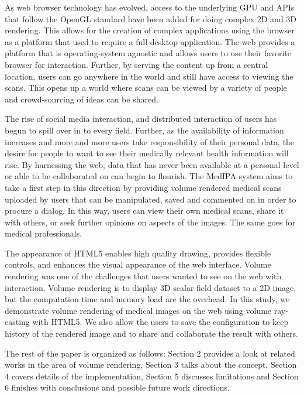\documentclass[annual]{acmsiggraph}
\begin{document}
As web browser technology has evolved, access to the underlying GPU and APIs that follow the OpenGL standard have been added for doing complex 2D and 3D rendering.  This allows for the creation of complex applications using the browser as a platform that used to require a full desktop application.  The web provides a platform that is operating-system agnostic and allows users to use their favorite browser for interaction.  Further, by serving the content up from a central location, users can go anywhere in the world and still have access to viewing the scans.  This opens up a world where scans can be viewed by a variety of people and crowd-sourcing of ideas can be shared.

The rise of social media interaction, and distributed interaction of users has begun to spill over in to every field.  Further, as the availability of information increases and more and more users take responsibility of their personal data, the desire for people to want to see their medically relevant health information will rise.  By harnessing the web, data that has never been available at a personal level or able to be collaborated on can begin to flourish.  The MedIPA system aims to take a first step in this direction by providing volume rendered medical scans uploaded by users that can be manipulated, saved and commented on in order to procure a dialog.  In this way, users can view their own medical scans, share it with others, or seek further opinions on aspects of the images.  The same goes for medical professionals.

The appearance of HTML5 enables high quality drawing, provides flexible controls, and enhances the visual appearance of the web interface. Volume rendering was one of the challenges that users wanted to see on the web with interaction. Volume rendering is to display 3D scalar field dataset to a 2D image, but the computation time and memory load are the overhead. In this study, we demonstrate volume rendering of medical images on the web using volume ray-casting with HTML5. We also allow the users to save the configuration to keep history of the rendered image and to share and collaborate the result with others. 

The rest of the paper is organized as follows: Section 2 provides a look at related works in the area of volume rendering, Section 3 talks about the concept, Section 4 covers details of the implementation, Section 5 discusses limitations and Section 6 finishes with conclusions and possible future work directions.
\end{document}
